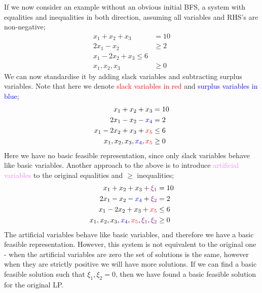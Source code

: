 \documentclass[a4paper, 12pt]{article}
\newcommand{\violet}[1]{\textcolor{violet}{#1}}
\newcommand{\blue}[1]{\textcolor{blue}{#1}}
\newcommand{\red}[1]{\textcolor{red}{#1}}
\begin{document}
                If we now consider an example without an obvious initial BFS, a system with equalities and inequalities in both direction, assuming all variables and RHS's are non-negative;
                \begin{align*}
                    x_1 + x_2 + x_3 & = 10 \\
                    2x_1 - x_2 & \geq 2 \\
                    x_1 - 2x_2 + x_3 \leq 6 \\
                    x_1, x_2, x_3 & \geq 0
                \end{align*}
                We can now standardise it by adding slack variables and subtracting surplus variables.
                Note that here we denote \red{slack variables in red} and \blue{surplus variables in blue};
                \begin{align*}
                    x_1 + x_2 + x_3 & = 10 \\
                    2x_1 - x_2 - \blue{x_4} & = 2 \\
                    x_1 - 2x_2 + x_3 + \red{x_5} & \leq 6 \\
                    x_1, x_2, x_3, \blue{x_4}, \red{x_5} & \geq 0
                \end{align*}
                Here we have no basic feasible representation, since only slack variables behave like basic variables.
                Another approach to the above is to introduce \violet{artificial variables} to the original equalities and $\geq$ inequalities;
                \begin{align*}
                    x_1 + x_2 + x_3 + \violet{\xi_1} & = 10 \\
                    2x_1 - x_2 - \blue{x_4} + \violet{\xi_2} & = 2 \\
                    x_1 - 2x_2 + x_3 + \red{x_5} & \leq 6 \\
                    x_1, x_2, x_3, \blue{x_4}, \red{x_5}, \violet{\xi_1}, \violet{\xi_2} & \geq 0
                \end{align*}
                The artificial variables behave like basic variables, and therefore we have a basic feasible representation.
                However, this system is not equivalent to the original one - when the artificial variables are zero the set of solutions is the same, however when they are strictly positive we will have more solutions.
                If we can find a basic feasible solution such that $\xi_1, \xi_2 = 0$, then we have found a basic feasible solution for the original LP.
                \medskip
\end{document}
